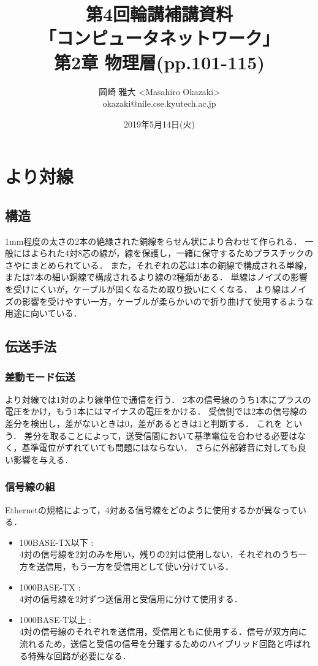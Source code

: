 \documentclass[a4paper]{ltjsarticle}
\title{第4回輪講補講資料 \\ 「コンピュータネットワーク」 \\ 第2章 物理層(pp.101-115)}
\author{岡崎 雅大 <Masahiro Okazaki> \\ okazaki@nile.cse.kyutech.ac.jp}
\date{2019年5月14日(火)}
\begin{document}
\maketitle
\tableofcontents

\section{より対線}\label{ux3088ux308aux5bfeux7dda}

\subsection{構造}\label{ux69cbux9020}

1mm程度の太さの2本の絶縁された銅線をらせん状により合わせて作られる．
一般にはよられた4対8芯の線が，線を保護し，一緒に保守するためプラスチックのさやにまとめられている．
また，それぞれの芯は1本の銅線で構成される単線，または7本の細い銅線で構成されるより線の2種類がある．
単線はノイズの影響を受けにくいが，ケーブルが固くなるため取り扱いにくくなる．
より線はノイズの影響を受けやすい一方，ケーブルが柔らかいので折り曲げて使用するような用途に向いている．

\subsection{伝送手法}\label{ux4f1dux9001ux624bux6cd5}

\subsubsection{差動モード伝送}\label{ux5deeux52d5ux30e2ux30fcux30c9ux4f1dux9001}

より対線では1対のより線単位で通信を行う．
2本の信号線のうち1本にプラスの電圧をかけ，もう1本にはマイナスの電圧をかける．
受信側では2本の信号線の差分を検出し，差がないときは0，差があるときは1と判断する．
これを  という．
差分を取ることによって，送受信間において基準電位を合わせる必要はなく，基準電位がずれていても問題にはならない．
さらに外部雑音に対しても良い影響を与える．

\subsubsection{信号線の組}\label{ux4fe1ux53f7ux7ddaux306eux7d44}

Ethernetの規格によって，4対ある信号線をどのように使用するかが異なっている．

\begin{itemize}
\item
  100BASE-TX以下 : \\
  4対の信号線を2対のみを用い，残りの2対は使用しない．それぞれのうち一方を送信用，もう一方を受信用として使い分けている．
\item
  1000BASE-TX : \\
  4対の信号線を2対ずつ送信用と受信用に分けて使用する．
\item
  1000BASE-T以上 : \\
  4対の信号線のそれぞれを送信用，受信用ともに使用する．信号が双方向に流れるため，送信と受信の信号を分離するためのハイブリッド回路と呼ばれる特殊な回路が必要になる．
\end{itemize}
\end{document}
